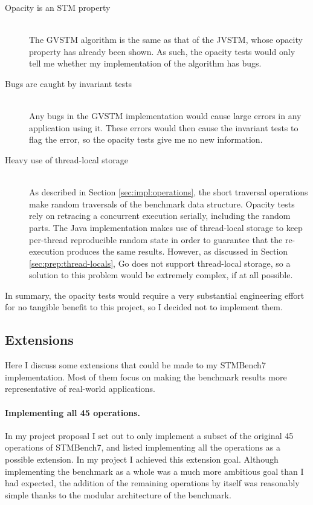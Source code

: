 \documentclass[12pt,a4paper,oneside,openright]{report}
\begin{document}
\begin{description}
\item[Opacity is an STM property] \hfill \\
  The GVSTM algorithm is the same as that of the JVSTM, whose opacity
  property has already been shown. As such, the opacity tests would
  only tell me whether my implementation of the algorithm has bugs.
\item[Bugs are caught by invariant tests] \hfill \\
  Any bugs in the GVSTM implementation would cause large errors in any
  application using it. These errors would then cause the invariant
  tests to flag the error, so the opacity tests give me no new
  information.
\item[Heavy use of thread-local storage] \hfill \\
  As described in Section \ref{sec:impl:operations}, the short
  traversal operations make random traversals of the benchmark data
  structure. Opacity tests rely on retracing a concurrent execution
  serially, including the random parts. The Java implementation makes
  use of thread-local storage to keep per-thread reproducible random
  state in order to guarantee that the re-execution produces the same
  results. However, as discussed in Section
  \ref{sec:prep:thread-locals}, Go does not support thread-local
  storage, so a solution to this problem would be extremely complex,
  if at all possible.
\end{description}
In summary, the opacity tests would require a very substantial
engineering effort for no tangible benefit to this project, so I
decided not to implement them.

\subsection{Extensions}
\label{sec:impl:possible-extensions}

Here I discuss some extensions that could be made to my STMBench7
implementation. Most of them focus on making the benchmark results
more representative of real-world applications.

\paragraph{Implementing all 45 operations.} In my project proposal I
set out to only implement a subset of the original 45 operations of
STMBench7, and listed implementing all the operations as a possible
extension. In my project I achieved this extension goal. Although
implementing the benchmark as a whole was a much more ambitious goal
than I had expected, the addition of the remaining operations by
itself was reasonably simple thanks to the modular architecture of the
benchmark.
\end{document}
